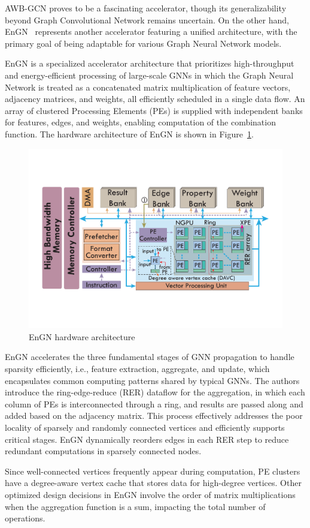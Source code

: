 AWB-GCN proves to be a fascinating accelerator, though its generalizability beyond Graph Convolutional Network remains uncertain.
On the other hand, EnGN~\cite{DBLP:journals/corr/abs-1909-00155} represents another accelerator featuring a unified architecture, with the primary goal of being adaptable for various Graph Neural Network models.

EnGN is a specialized accelerator architecture that prioritizes high-throughput and energy-efficient processing of large-scale GNNs in which the Graph Neural Network is treated as a concatenated matrix multiplication of feature vectors, adjacency matrices, and weights, all efficiently scheduled in a single data flow.
An array of clustered Processing Elements (PEs) is supplied with independent banks for features, edges, and weights, enabling computation of the combination function.
The hardware architecture of EnGN is shown in Figure~\ref{fig:engn_architecture}.

\begin{figure}[t]
    \centering
    \includegraphics[height=0.3\textwidth]{Images/EnGN_architecture}
    \caption{EnGN hardware architecture~\cite{DBLP:journals/corr/abs-1909-00155}}
    \label{fig:engn_architecture}
\end{figure}

EnGN accelerates the three fundamental stages of GNN propagation to handle sparsity efficiently, i.e., feature extraction, aggregate, and update, which encapsulates common computing patterns shared by typical GNNs.
The authors introduce the ring-edge-reduce (RER) dataflow for the aggregation, in which each column of PEs is interconnected through a ring, and results are passed along and added based on the adjacency matrix.
This process effectively addresses the poor locality of sparsely and randomly connected vertices and efficiently supports critical stages.
EnGN dynamically reorders edges in each RER step to reduce redundant computations in sparsely connected nodes.

Since well-connected vertices frequently appear during computation, PE clusters have a degree-aware vertex cache that stores data for high-degree vertices.
Other optimized design decisions in EnGN involve the order of matrix multiplications when the aggregation function is a sum, impacting the total number of operations.

